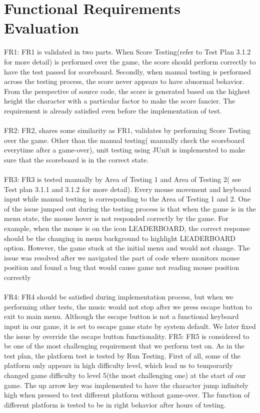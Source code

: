 \documentclass[12pt, titlepage]{article}
\begin{document}
\section{Functional Requirements Evaluation}
FR1: FR1 is validated in two parts. When Score Testing(refer to Test Plan 3.1.2 for more detail) is performed over the game, the score should perform correctly to have the test passed for scoreboard. Secondly, when manual testing is performed across the testing process, the score never appears to have abnormal behavior. From the perspective of source code, the score is generated based on the highest height the character with a particular factor to make the score fancier. The requirement is already satisfied even before the implementation of test.\\\\
FR2: FR2, shares some similarity as FR1, validates by performing Score Testing over the game. Other than the manual testing( manually check the scoreboard everytime after a game-over), unit testing using JUnit is implemented to make sure that the scoreboard is in the correct state.\\\\
FR3: FR3 is tested manually by Area of Testing 1 and Area of Testing 2( see Test plan 3.1.1 and 3.1.2 for more detail). Every mouse movement and keyboard input while manual testing is corresponding to the Area of Testing 1 and 2. One of the issue jumped out during the testing process is that when the game is in the menu state, the mouse hover is not responded correctly by the game. For example, when the mouse is on the icon LEADERBOARD, the correct response should be the changing in menu background to highlight LEADERBOARD option. However, the game stuck at the initial menu and would not change. The issue was resolved after we navigated the part of code where monitors mouse position and found a bug that would cause game not reading mouse position correctly\\\\
FR4: FR4 should be satisfied during implementation process, but when we performing other tests, the music would not stop after we press escape button to exit to main menu. Although the escape button is not a functional keyboard input in our game, it is set to escape game state by system default. We later fixed the issue by override the escape button functionality.
FR5: FR5 is considered to be one of the most challenging requirement that we perform test on. As in the test plan, the platform test is tested by Run Testing. First of all, some of the platform only appears in high difficulty level, which lead us to temporarily changed game difficulty to level 5(the most challenging one) at the start of our game. The up arrow key was implemented to have the character jump infinitely high when pressed to test different platform without game-over. The function of different platform is tested to be in right behavior after hours of testing.\\\\
\end{document}
